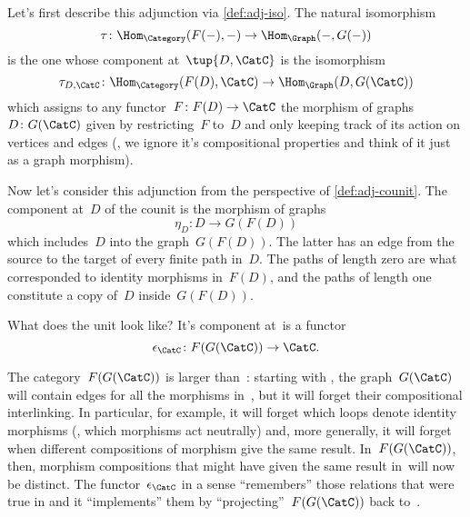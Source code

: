 Let's first describe this adjunction via \cref{def:adj-iso}. The natural isomorphism
\begin{equation*}
  \tau\colon \Hom_{\Category}(F(- ), - ) \to \Hom_{\Graph}(- , G( - ))
\end{equation*}
is the one whose component at~$\tup{D,\CatC}$ is the isomorphism
\begin{equation*}
  \tau_{D,\CatC} \colon \Hom_{\Category}(F(D), \CatC) \to \Hom_{\Graph}(D, G(\CatC))
\end{equation*}
which assigns to any functor~$F\colon F(D) \to \CatC$ the morphism of graphs~$D \colon G(\CatC)$ given by restricting~$F$ to~$D$ and only keeping track of its action on vertices and edges (\ie , we ignore it's compositional properties and think of it just as a graph morphism).

Now let's consider this adjunction from the perspective of \cref{def:adj-counit}. The component at~$D$ of the counit is the morphism of graphs
\begin{equation*}
  \eta_D \colon D \to  G(F(D))
\end{equation*}
which includes~$D$ into the graph~$G(F(D))$. The latter has an edge from the source to the target of every finite path in~$D$. The paths of length zero are what corresponded to identity morphisms in~$F(D)$, and the paths of length one constitute a copy of~$D$ inside~$G(F(D))$.

What does the unit look like? It's component at~\CatC is a functor
\begin{equation*}
  \epsilon_{\CatC} \colon F(G(\CatC)) \to \CatC.
\end{equation*}

The category~$F(G(\CatC))$ is larger than~\CatC: starting with \CatC, the graph~$G(\CatC)$ will contain edges for all the morphisms in~\CatC, but it will forget their compositional interlinking. In particular, for example, it will forget which loops denote identity morphisms (\ie , which morphisms act neutrally) and, more generally, it will forget when different compositions of morphism give the same result. In~$F(G(\CatC))$, then, morphism compositions that might have given the same result in~\CatC will now be distinct.
The functor~$\epsilon_{\CatC}$ in a sense ``remembers'' those relations that were true in \CatC and it ``implements'' them by ``projecting''~$F(G(\CatC))$ back to~\CatC.

